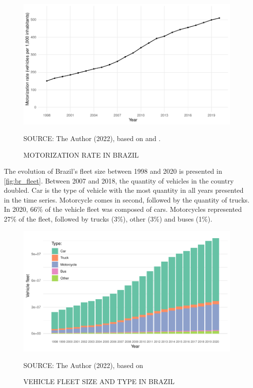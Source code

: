 
\begin{figure}[!htbp]
    \centering\footnotesize
    \captionsetup{font=footnotesize}
    \caption{MOTORIZATION RATE IN BRAZIL}
    \includegraphics{fig/brazil_motor.pdf}
    \label{fig:br_motor}
    \par SOURCE: The Author (2022), based on \textcite{MinistryofHealth2022} and \textcite{DENATRAN2020}.
\end{figure} 

The evolution of Brazil's fleet size between 1998 and 2020 is presented in \autoref{fig:br_fleet}. Between 2007 and 2018, the quantity of vehicles in the country doubled. Car is the type of vehicle with the most quantity in all years presented in the time series. Motorcycle comes in second, followed by the quantity of trucks. In 2020, 66\% of the vehicle fleet was composed of cars. Motorcycles represented 27\% of the fleet, followed by trucks (3\%), other (3\%) and buses (1\%). 

\begin{figure}[!htbp]
    \centering\footnotesize
    \captionsetup{font=footnotesize}
    \caption{VEHICLE FLEET SIZE AND TYPE IN BRAZIL}
    \includegraphics{fig/brazil_fleet_type.pdf}
    \label{fig:br_fleet}
    \par SOURCE: The Author (2022), based on \textcite{DENATRAN2020}
\end{figure}

